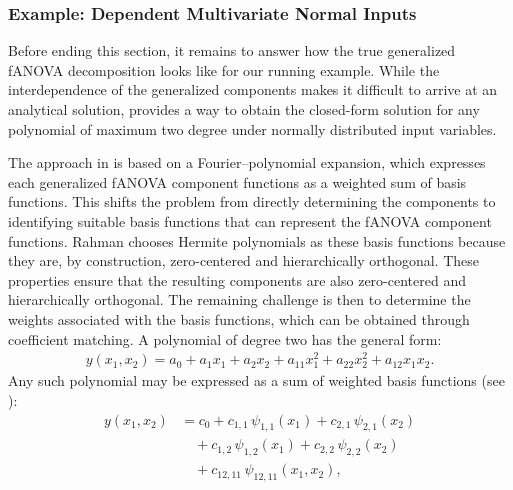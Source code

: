 \subsubsection{Example: Dependent Multivariate Normal Inputs}
Before ending this section, it remains to answer how the true generalized fANOVA decomposition looks like for our running example. While the interdependence of the generalized components makes it difficult to arrive at an analytical solution, \citet{rahman2014} provides a way to obtain the closed-form solution for any polynomial of maximum two degree under normally distributed input variables.\par
The approach in \cite{rahman2014} is based on a Fourier–polynomial expansion, 
which expresses each generalized fANOVA component functions as a weighted sum of basis functions. 
This shifts the problem from directly determining the components 
to identifying suitable basis functions that can represent the fANOVA component functions. 
Rahman chooses Hermite polynomials as these basis functions because they are, 
by construction, zero-centered and hierarchically orthogonal. 
These properties ensure that the resulting components are also 
zero-centered and hierarchically orthogonal. 
The remaining challenge is then to determine the weights associated with the basis functions, 
which can be obtained through coefficient matching.
A polynomial of degree two has the general form:
\begin{align}\label{eq:quadratic_polynomial}
    y(x_1,x_2)
    = a_0 + a_1 x_1 + a_2 x_2 
      + a_{11} x_1^2 + a_{22} x_2^2 + a_{12} x_1 x_2.
\end{align}
Any such polynomial may be expressed as a sum of weighted basis functions 
(see \cite{nagler2024linalg}):
\[
\begin{aligned}
y(x_1,x_2)
    &= c_0 
     + c_{1,1}\,\psi_{1,1}(x_1) 
     + c_{2,1}\,\psi_{2,1}(x_2) \\ 
    &\quad
     + c_{1,2}\,\psi_{1,2}(x_1)
     + c_{2,2}\,\psi_{2,2}(x_2) \\
    &\quad
     + c_{12,11}\,\psi_{12,11}(x_1,x_2),
\end{aligned}
\]

